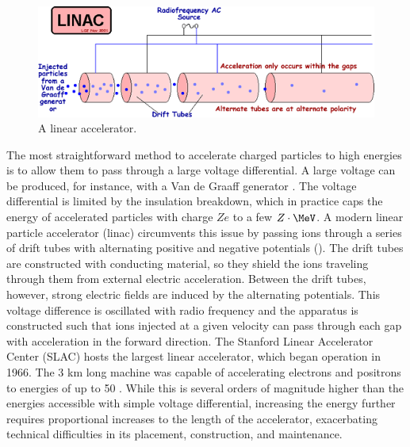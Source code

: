 \begin{figure}[t]
  \includegraphics[width=0.8\linewidth]{LINAC.png}
  \caption{A linear accelerator.}
  \label{fig:linac}
\end{figure}

The most straightforward method to accelerate charged particles to high energies is to allow them to pass through a large voltage differential.
A large voltage can be produced, for instance, with a Van de Graaff generator \cite{PhysRev.43.149}.
The voltage differential is limited by the insulation breakdown, which in practice caps the energy of accelerated particles with charge $Ze$ to a few $Z \cdot\MeV$.
A modern linear particle accelerator (linac) circumvents this issue by passing ions through a series of drift tubes with alternating positive and negative potentials (\Fig{\ref{fig:linac}}).
The drift tubes are constructed with conducting material, so they shield the ions traveling through them from external electric acceleration.
Between the drift tubes, however, strong electric fields are induced by the alternating potentials.
This voltage difference is oscillated with radio frequency and the apparatus is constructed such that ions injected at a given velocity can pass through each gap with acceleration in the forward direction.
The Stanford Linear Accelerator Center (SLAC) hosts the largest linear accelerator, which began operation in 1966.
The 3 km long machine was capable of accelerating electrons and positrons to energies of up to 50 \GeV.
While this is several orders of magnitude higher than the energies accessible with simple voltage differential, increasing the energy further requires proportional increases to the length of the accelerator, exacerbating technical difficulties in its placement, construction, and maintenance.

